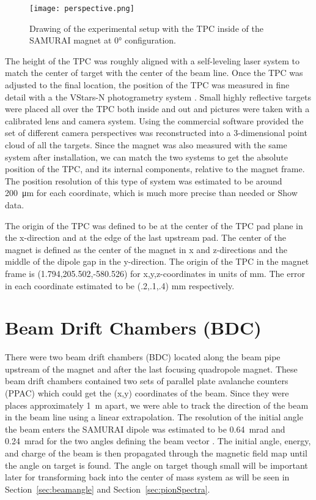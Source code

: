 \begin{figure}
\texttt{[image: perspective.png]}
\caption{Drawing of the experimental setup with the TPC inside of the SAMURAI magnet at $\ang{0}$ configuration.}
\label{fig:experiment}
\end{figure}

The height of the TPC was roughly aligned with a self-leveling laser system to match the center of target with the center of the beam line. Once the TPC was adjusted to the final location, the position of the TPC was measured in fine detail with a the VStars-N photogrametry system \cite{vstars}. Small highly reflective targets were placed all over the TPC both inside and out and pictures were taken with a calibrated lens and camera system. Using the commercial software provided the set of different camera perspectives was reconstructed into a 3-dimensional point cloud of all the targets. Since the magnet was also measured with the same system after installation, we can match the two systems to get the absolute position of the TPC, and its internal components, relative to the magnet frame. The position resolution of this type of system was estimated to be around \SI{200}{\micro\metre} for each coordinate, which is much more precise than needed or Show data.

The origin of the \spirit TPC was defined to be at the center of the TPC pad plane in the x-direction and at the edge of the last upstream pad. The center of the magnet is defined as the center of the magnet in x and z-directions and the middle of the dipole gap in the y-direction. The origin of the \spirit TPC in the magnet frame is (1.794,205.502,-580.526) for x,y,z-coordinates in units of \si{\milli\metre}. The error in each coordinate estimated to be (.2,.1,.4) \si{\milli\metre} respectively. 


\section{Beam Drift Chambers (BDC)}
\label{sec:bdc}

There were two beam drift chambers (BDC) located along the beam pipe upstream of the magnet and after the last focusing quadropole magnet. These beam drift chambers contained two sets of parallel plate avalanche counters (PPAC) which could get the (x,y) coordinates of the beam. Since they were places approximately \SI{1}{\metre} apart, we were able to track the direction of the beam in the beam line using a linear extrapolation. The resolution of the initial angle the beam enters the SAMURAI dipole was estimated to be \SI{0.64}{\milli\radian} and \SI{0.24}{\milli\radian} for the two angles defining the beam vector \cite{jon}. The initial angle, energy, and charge of the beam is then propagated through the magnetic field map until the angle on target is found. The angle on target though small will be important later for transforming back into the center of mass system as will be seen in Section~\ref{sec:beamangle} and Section~\ref{sec:pionSpectra}.


